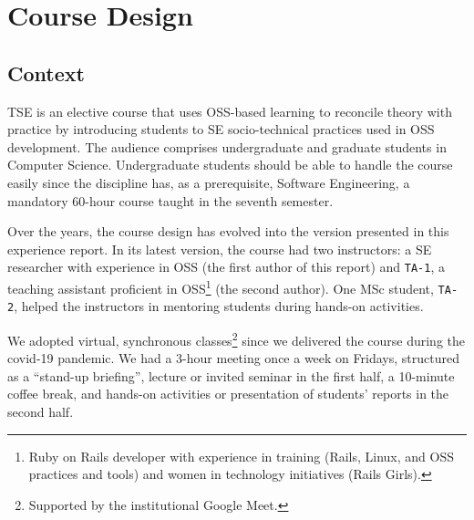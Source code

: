 \documentclass[sigconf]{acmart}
\begin{document}
\section{Course Design}
\label{sec:course_design}

\subsection{Context} \label{sec:context}


TSE is an elective course that uses OSS-based learning to reconcile theory with practice by introducing students to SE socio-technical practices used in OSS development. The audience comprises undergraduate and graduate students in Computer Science. 
Undergraduate students should be able to handle the course easily since the discipline has, as a prerequisite, Software Engineering, a mandatory 60-hour course taught in the seventh semester. 

Over the years, the course design has evolved into the version presented in this experience report.
%
In its latest version, the course had two instructors: a SE researcher with experience in OSS (the first author of this report) and \texttt{TA-1}, a teaching assistant proficient in OSS\footnote{Ruby on Rails developer with experience in training (Rails, Linux, and OSS practices and tools) and women in technology initiatives (Rails Girls).} (the second author). One MSc student, \texttt{TA-2}, helped the instructors in mentoring students during hands-on activities. 

We adopted virtual, synchronous classes\footnote{Supported by the institutional Google Meet.} since we delivered the course during the covid-19 pandemic. 
We had a 3-hour meeting once a week on Fridays, structured as a ``stand-up briefing'', lecture or invited seminar in the first half, a 10-minute coffee break, and hands-on activities or presentation of students' reports in the second half.  
\end{document}
